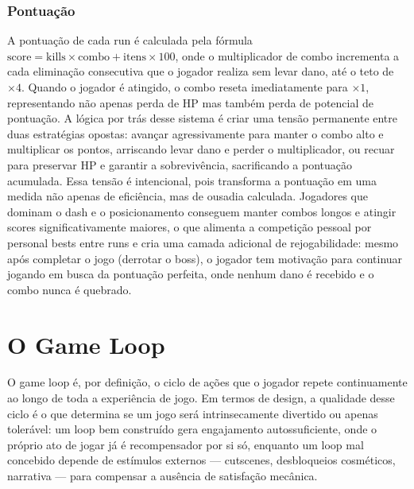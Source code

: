 \documentclass[12pt, a4paper]{article}
\begin{document}
\subsubsection{Pontua\c{c}\~ao}

A pontua\c{c}\~ao de cada run \'e calculada pela f\'ormula $\text{score} = \text{kills} \times \text{combo} + \text{itens} \times 100$, onde o multiplicador de combo incrementa a cada elimina\c{c}\~ao consecutiva que o jogador realiza sem levar dano, at\'e o teto de $\times4$. Quando o jogador \'e atingido, o combo reseta imediatamente para $\times1$, representando n\~ao apenas perda de HP mas tamb\'em perda de potencial de pontua\c{c}\~ao. A l\'ogica por tr\'as desse sistema \'e criar uma tens\~ao permanente entre duas estrat\'egias opostas: avan\c{c}ar agressivamente para manter o combo alto e multiplicar os pontos, arriscando levar dano e perder o multiplicador, ou recuar para preservar HP e garantir a sobreviv\^encia, sacrificando a pontua\c{c}\~ao acumulada. Essa tens\~ao \'e intencional, pois transforma a pontua\c{c}\~ao em uma medida n\~ao apenas de efici\^encia, mas de ousadia calculada. Jogadores que dominam o dash e o posicionamento conseguem manter combos longos e atingir scores significativamente maiores, o que alimenta a competi\c{c}\~ao pessoal por personal bests entre runs e cria uma camada adicional de rejogabilidade: mesmo ap\'os completar o jogo (derrotar o boss), o jogador tem motiva\c{c}\~ao para continuar jogando em busca da pontua\c{c}\~ao perfeita, onde nenhum dano \'e recebido e o combo nunca \'e quebrado.

\newpage
\section{O Game Loop}

O game loop \'e, por defini\c{c}\~ao, o ciclo de a\c{c}\~oes que o jogador repete continuamente ao longo de toda a experi\^encia de jogo. Em termos de design, a qualidade desse ciclo \'e o que determina se um jogo ser\'a intrinsecamente divertido ou apenas toler\'avel: um loop bem constru\'ido gera engajamento autossuficiente, onde o pr\'oprio ato de jogar j\'a \'e recompensador por si s\'o, enquanto um loop mal concebido depende de est\'imulos externos --- cutscenes, desbloqueios cosm\'eticos, narrativa --- para compensar a aus\^encia de satisfa\c{c}\~ao mec\^anica.
\end{document}

